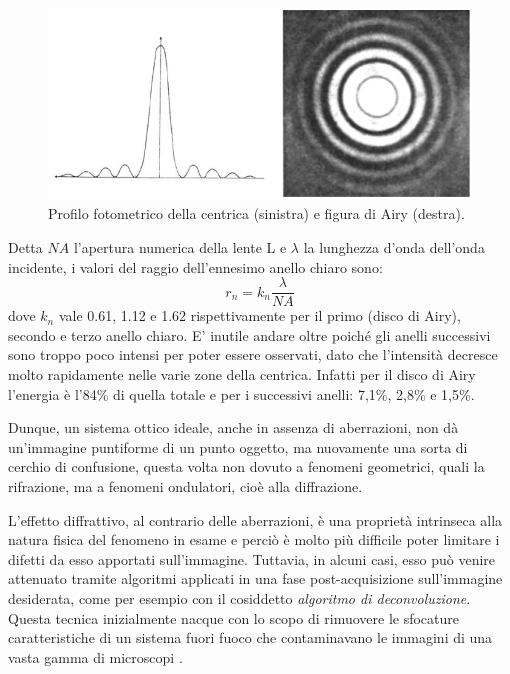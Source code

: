 \begin{figure}
 \centering
 \includegraphics[scale=.50]{img/CAP2diff2.png}
 \caption{\small{Profilo fotometrico della centrica (sinistra) e figura di Airy (destra).}}
 \label{fig:diff2}
\end{figure}

Detta $NA$ l'apertura numerica della lente L e $\lambda$ la lunghezza d'onda dell'onda incidente, i valori del raggio dell'ennesimo anello chiaro sono:
$$r_n = k_n \frac{\lambda}{NA} $$
dove $k_n$ vale 0.61, 1.12 e 1.62 rispettivamente per il primo (disco di Airy), secondo e terzo anello chiaro.
E' inutile andare oltre poiché gli anelli successivi sono troppo poco intensi per poter essere osservati, dato che l'intensità decresce molto rapidamente nelle varie zone della centrica. 
Infatti per il  disco di Airy l'energia è l'84\% di quella totale e per i successivi anelli: 7,1\%, 2,8\% e 1,5\%.

Dunque, un sistema ottico ideale, anche in assenza di aberrazioni, non dà un'immagine puntiforme di un punto oggetto, ma nuovamente una sorta di cerchio di confusione, questa volta non dovuto a fenomeni geometrici, quali la rifrazione, ma a fenomeni ondulatori, cioè alla diffrazione.

L'effetto diffrattivo, al contrario delle aberrazioni, è una proprietà intrinseca alla natura fisica del fenomeno in esame e perciò è molto più difficile poter limitare i difetti da esso apportati sull'immagine. 
Tuttavia, in alcuni casi, esso può venire attenuato tramite algoritmi applicati in una fase post-acquisizione sull'immagine desiderata, come per esempio con il cosiddetto \textit{algoritmo di deconvoluzione}.
Questa  tecnica inizialmente nacque con lo scopo di rimuovere le sfocature caratteristiche di un sistema fuori fuoco che contaminavano le immagini di una vasta gamma di microscopi \cite{decon}. 

